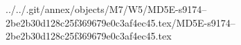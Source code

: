../../.git/annex/objects/M7/W5/MD5E-s9174--2be2b30d128c25f369679e0c3af4ec45.tex/MD5E-s9174--2be2b30d128c25f369679e0c3af4ec45.tex